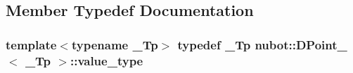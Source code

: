 \subsection{Member Typedef Documentation}
\hypertarget{classnubot_1_1DPoint___a1a546245bbee6a62f83ed6126035c61a}{
\subsubsection[{value\-\_\-type}]{\setlength{\rightskip}{0pt plus 5cm}template$<$typename \-\_\-\-Tp$>$ typedef \-\_\-\-Tp {\bf nubot\-::\-D\-Point\-\_\-}$<$ \-\_\-\-Tp $>$\-::{\bf value\-\_\-type}}}\label{classnubot_1_1DPoint___a1a546245bbee6a62f83ed6126035c61a}



